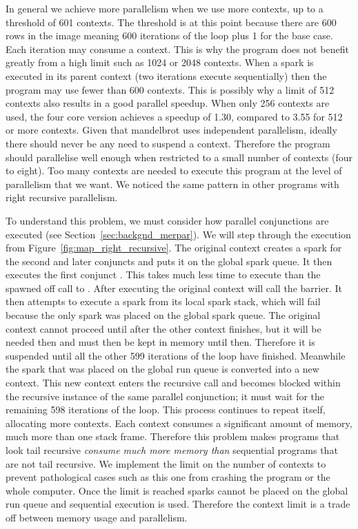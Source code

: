 In general we achieve more parallelism when we use more contexts,
up to a threshold of 601 contexts.
The threshold is at this point because
there are 600 rows in the image meaning 600 iterations of the loop plus 1
for the base case.
Each iteration may consume a context.
This is why the program does not benefit greatly from a high limit such as
1024 or 2048 contexts.
When a spark is executed in its parent context
(two iterations execute sequentially)
then the program may use fewer than 600 contexts.
This is possibly why a limit of 512 contexts also results in a good parallel
speedup.
When only 256 contexts are used,
the four core version achieves a speedup of 1.30,
compared to 3.55 for 512 or more contexts.
Given that mandelbrot uses independent parallelism,
ideally there should never be any need to suspend a context.
Therefore the program should parallelise well enough when restricted to
a small number of contexts (four to eight).
Too many contexts are needed to execute this program at the level of
parallelism that we want.
We noticed the same pattern in other programs with right recursive
parallelism.

\label{context_limit}
To understand this problem, we must consider how parallel conjunctions are
executed (see Section~\ref{sec:backgnd_merpar}).
We will step through the execution  from
Figure~\ref{fig:map_right_recursive}.
The original context creates a spark for the second and later conjuncts and
puts it on the global spark queue.
It then executes the first conjunct .
This takes much less time to execute than the spawned off call to
.
After executing  the original context will call the
\joinandcontinue barrier.
It then attempts to execute a spark from its local spark stack,
which will fail because the only spark was placed on the global spark queue.
The original context cannot proceed until after the other context finishes,
but it will be needed then and must then be kept in memory until then.
Therefore it is suspended until all the other 599 iterations of the loop
have finished.
Meanwhile the spark that was placed on the global run queue is converted
into a new context.
This new context enters the recursive call and
becomes blocked within the recursive instance of the same parallel
conjunction;
it must wait for the remaining 598 iterations of the loop.
This process continues to repeat itself,
allocating more contexts.
Each context consumes a significant amount of memory,
much more than one stack frame.
Therefore
this problem makes programs that look tail recursive
\emph{consume much more memory than}
sequential programs that are not tail recursive.
We implement the limit on the number of contexts to prevent pathological
cases such as this one from crashing the program or the whole computer.
Once the limit is reached sparks cannot be placed on the global run queue
and sequential execution is used.
Therefore the context limit is a trade off between memory usage and
parallelism.

